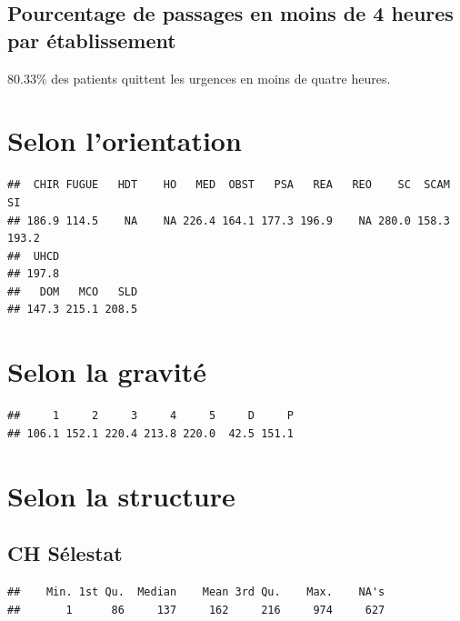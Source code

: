 \documentclass[12pt,english,french,twoside]{report}\usepackage[]{graphicx}\usepackage[]{color}
\makeatletter
\newenvironment{kframe}{%
 \def\at@end@of@kframe{}%
 \ifinner\ifhmode%
  \def\at@end@of@kframe{\end{minipage}}%
  \begin{minipage}{\columnwidth}%
 \fi\fi%
 \def\FrameCommand##1{\hskip\@totalleftmargin \hskip-\fboxsep
 \colorbox{shadecolor}{##1}\hskip-\fboxsep
     \hskip-\linewidth \hskip-\@totalleftmargin \hskip\columnwidth}%
 \MakeFramed {\advance\hsize-\width
   \@totalleftmargin\z@ \linewidth\hsize
   \@setminipage}}%
 {\par\unskip\endMakeFramed%
 \at@end@of@kframe}
\newenvironment{knitrout}{}{} %
\makeatother
\begin{document}
\subsection*{Pourcentage de passages en moins de 4 heures par établissement}



80.33\% des patients quittent les urgences en moins de quatre heures.

\section*{Selon l'orientation}
\begin{knitrout}
\color{fgcolor}\begin{kframe}
\begin{verbatim}
##  CHIR FUGUE   HDT    HO   MED  OBST   PSA   REA   REO    SC  SCAM    SI 
## 186.9 114.5    NA    NA 226.4 164.1 177.3 196.9    NA 280.0 158.3 193.2 
##  UHCD 
## 197.8
##   DOM   MCO   SLD 
## 147.3 215.1 208.5
\end{verbatim}
\end{kframe}
\end{knitrout}



\section*{Selon la gravité}
\begin{knitrout}
\color{fgcolor}\begin{kframe}
\begin{verbatim}
##     1     2     3     4     5     D     P 
## 106.1 152.1 220.4 213.8 220.0  42.5 151.1
\end{verbatim}
\end{kframe}
\end{knitrout}


\section*{Selon la structure}
\subsection{CH Sélestat}
\begin{knitrout}
\color{fgcolor}\begin{kframe}
\begin{verbatim}
##    Min. 1st Qu.  Median    Mean 3rd Qu.    Max.    NA's 
##       1      86     137     162     216     974     627
\end{verbatim}
\end{kframe}
\end{knitrout}
\end{document}
